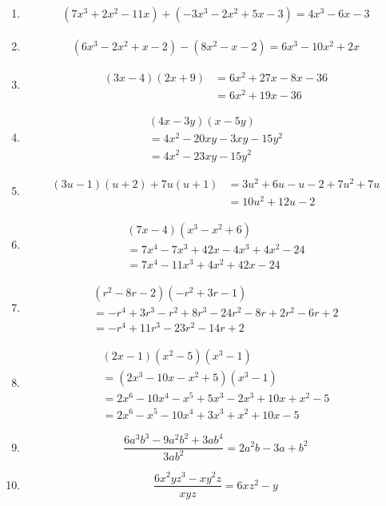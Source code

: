 \documentclass{article}
\begin{document}
\begin{enumerate}
	\item
	      \begin{align}
		      (7x^3+2x^2-11x)+(-3x^3-2x^2+5x-3) = 4x^3-6x-3
	      \end{align}
	\item
	      \begin{align}
		      (6x^3-2x^2+x-2)-(8x^2-x-2) = 6x^3-10x^2+2x
	      \end{align}
	\item
	      \begin{align}
		      (3x-4)(2x+9) & = 6x^2+27x-8x-36 \\
		                   & = 6x^2+19x-36
	      \end{align}
	\item
	      \begin{align}
		      (4x-3y)(x-5y)         \\
		      = 4x^2-20xy-3xy-15y^2 \\
		      =4x^2-23xy-15y^2
	      \end{align}
	\item
	      \begin{align}
		      (3u-1)(u+2)+7u(u+1) & = 3u^2+6u-u-2+7u^2+7u \\
		                          & = 10u^2+12u-2
	      \end{align}
	\item
	      \begin{align}
		      (7x-4)(x^3-x^2+6)            \\
		      = 7x^4-7x^3+42x-4x^3+4x^2-24 \\
		      =7x^4-11x^3+4x^2+42x-24
	      \end{align}
	\item
	      \begin{align}
		      (r^2-8r-2)(-r^2+3r-1)                   \\
		      = -r^4+3r^3-r^2+8r^3-24r^2-8r+2r^2-6r+2 \\
		      = -r^4+11r^3-23r^2-14r+2
	      \end{align}
	\item
	      \begin{align}
		      (2x-1)(x^2-5)(x^3-1)                 \\
		      = (2x^3-10x-x^2+5)(x^3-1)            \\
		      = 2x^6-10x^4-x^5+5x^3-2x^3+10x+x^2-5 \\
		      = 2x^6-x^5-10x^4+3x^3+x^2+10x-5
	      \end{align}
	\item
	      \[ \frac{6a^3b^3-9a^2b^2+3ab^4}{3ab^2} = 2a^2b-3a+b^2 \]
	\item
	      \[ \frac{6x^2yz^3-xy^2z}{xyz}=6xz^2-y \]
\end{enumerate}
\end{document}
